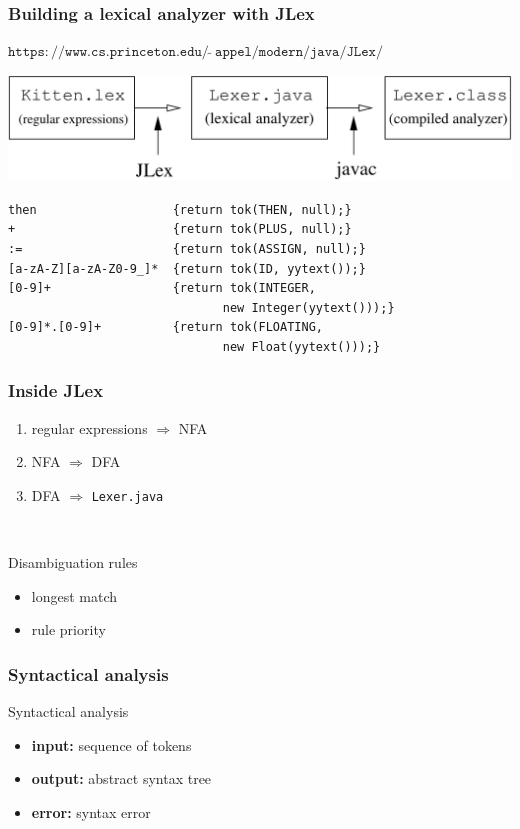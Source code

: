 \documentclass[11pt]{beamer}  %
\begin{document}
\begin{frame}[fragile]\frametitle{Building a lexical analyzer with JLex}

$\mathtt{https://www.cs.princeton.edu/\ \tilde{}\ appel/modern/java/JLex/}$

\begin{center}
\includegraphics[scale=0.4]{pictures/jlex.pdf}
\end{center}

\begin{verbatim}
then                   {return tok(THEN, null);}
+                      {return tok(PLUS, null);}
:=                     {return tok(ASSIGN, null);}
[a-zA-Z][a-zA-Z0-9_]*  {return tok(ID, yytext());}
[0-9]+                 {return tok(INTEGER,
                              new Integer(yytext()));}
[0-9]*.[0-9]+          {return tok(FLOATING,
                              new Float(yytext()));}
\end{verbatim}

\end{frame}

\begin{frame}
\frametitle{Inside JLex}

\begin{enumerate}
\item regular expressions $\Rightarrow$ NFA
\item NFA $\Rightarrow$ DFA
\item DFA $\Rightarrow$ \texttt{Lexer.java}
\end{enumerate}

\mbox{}\\

\begin{greenbox}{Disambiguation rules}
\begin{itemize}
\item longest match
\item rule priority
\end{itemize}
\end{greenbox}

\end{frame}

\begin{frame}
\frametitle{Syntactical analysis}

\begin{center}
\begin{redbox}{Syntactical analysis}
\begin{itemize}
\item \textbf{input:} sequence of tokens
\item \textbf{output:} abstract syntax tree
\item \textbf{error:} syntax error
\end{itemize}
\end{redbox}
\end{center}

\end{frame}
\end{document}
